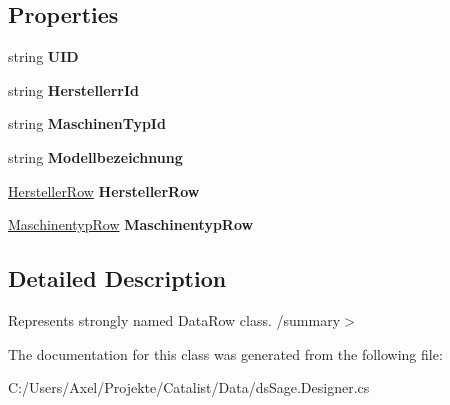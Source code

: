 \subsection*{Properties}
\begin{DoxyCompactItemize}
\item 
string {\bfseries U\+ID}\hypertarget{class_products_1_1_data_1_1ds_sage_1_1_maschinenmodell_row_aea07aab2555d84add26c6ab5247a6522}{}\label{class_products_1_1_data_1_1ds_sage_1_1_maschinenmodell_row_aea07aab2555d84add26c6ab5247a6522}

\item 
string {\bfseries Herstellerr\+Id}\hypertarget{class_products_1_1_data_1_1ds_sage_1_1_maschinenmodell_row_a836577eb4f55774b633a42fe6b1e3b89}{}\label{class_products_1_1_data_1_1ds_sage_1_1_maschinenmodell_row_a836577eb4f55774b633a42fe6b1e3b89}

\item 
string {\bfseries Maschinen\+Typ\+Id}\hypertarget{class_products_1_1_data_1_1ds_sage_1_1_maschinenmodell_row_a443765df8f86abb89ecc3cb3069d1029}{}\label{class_products_1_1_data_1_1ds_sage_1_1_maschinenmodell_row_a443765df8f86abb89ecc3cb3069d1029}

\item 
string {\bfseries Modellbezeichnung}\hypertarget{class_products_1_1_data_1_1ds_sage_1_1_maschinenmodell_row_a4a9648867bba0a0583c357bab4fda608}{}\label{class_products_1_1_data_1_1ds_sage_1_1_maschinenmodell_row_a4a9648867bba0a0583c357bab4fda608}

\item 
\hyperlink{class_products_1_1_data_1_1ds_sage_1_1_hersteller_row}{Hersteller\+Row} {\bfseries Hersteller\+Row}\hypertarget{class_products_1_1_data_1_1ds_sage_1_1_maschinenmodell_row_a28cc0453c8ca43e4763721e0ea271756}{}\label{class_products_1_1_data_1_1ds_sage_1_1_maschinenmodell_row_a28cc0453c8ca43e4763721e0ea271756}

\item 
\hyperlink{class_products_1_1_data_1_1ds_sage_1_1_maschinentyp_row}{Maschinentyp\+Row} {\bfseries Maschinentyp\+Row}\hypertarget{class_products_1_1_data_1_1ds_sage_1_1_maschinenmodell_row_afaadd22f5f80f3e73ca5d632b9e2fa46}{}\label{class_products_1_1_data_1_1ds_sage_1_1_maschinenmodell_row_afaadd22f5f80f3e73ca5d632b9e2fa46}

\end{DoxyCompactItemize}


\subsection{Detailed Description}
Represents strongly named Data\+Row class. /summary$>$ 

The documentation for this class was generated from the following file\+:\begin{DoxyCompactItemize}
\item 
C\+:/\+Users/\+Axel/\+Projekte/\+Catalist/\+Data/ds\+Sage.\+Designer.\+cs\end{DoxyCompactItemize}
